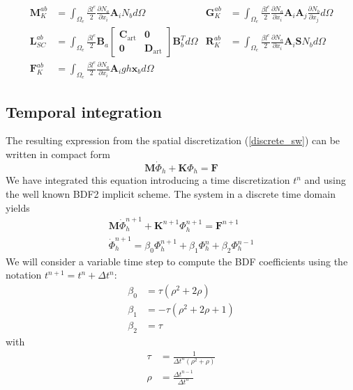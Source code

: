 \documentclass[a4paper,12pt]{article}
\newcommand{\pder}[2]{\frac{\partial#1}{\partial#2}}
\begin{document}
\begin{align}
\displaystyle\mathbf{M}_K^{ab} &= \int_{\Omega_e} \frac{\beta l^e}{2} \pder{N_a}{x_i}\mathbf{A}_i N_b d\Omega &
\displaystyle\mathbf{G}_K^{ab} &= \int_{\Omega_e} \frac{\beta l^e}{2} \pder{N_a}{x_i}\mathbf{A}_i\mathbf{A}_j \pder{N_b}{x_j} d\Omega \nonumber\\
\displaystyle\mathbf{L}_{SC}^{ab} &= \int_{\Omega_e} \frac{\beta l^e}{2} \mathbf{B}_a \left[\begin{matrix}
        \mathbf{C}_\text{art} & \mathbf{0} \\ \mathbf{0} & \mathbf{D}_\text{art}
    \end{matrix}\right] \mathbf{B}_b^T d\Omega &
\displaystyle\mathbf{R}_K^{ab} &= \int_{\Omega_e} \frac{\beta l^e}{2} \pder{N_a}{x_i}\mathbf{A}_i \mathbf{S} N_b d\Omega \\
\displaystyle\mathbf{F}_K^{ab} &= \int_{\Omega_e} \frac{\beta l^e}{2} \pder{N_a}{x_i}\mathbf{A}_i gh\mathbf{x}_b d\Omega
\nonumber
\end{align}


\subsection{Temporal integration}

The resulting expression from the spatial discretization (\ref{discrete_sw}) can be written in compact form 
\begin{equation} \label{discrete_compact}
\mathbf{M}\dot{\Phi}_h + \mathbf{K}\Phi_h = \mathbf{F}
\end{equation}
We have integrated this equation introducing a time discretization $t^n$ and using the well known BDF2 implicit scheme. The system in a discrete time domain yields
\begin{equation}
\begin{split} \label{discrete_bdf2}
\mathbf{M}\dot{\Phi}_h^{n+1} + \mathbf{K}^{n+1}\Phi_h^{n+1} = \mathbf{F}^{n+1} \\
\dot{\Phi}_h^{n+1} = \beta_0 \Phi_h^{n+1} + \beta_1 \Phi_h^n + \beta_2 \Phi_h^{n-1}
\end{split}
\end{equation}
We will consider a variable time step to compute the BDF coefficients using the notation $t^{n+1} = t^n + \Delta t^n$:
\begin{equation}
\begin{split}
\beta_0 &= \tau (\rho^2 + 2\rho) \\
\beta_1 &= -\tau (\rho^2 + 2\rho + 1) \\
\beta_2 &= \tau
\end{split}
\end{equation}
with
\begin{equation}
\begin{split}
\tau &= \frac{1}{\Delta t^n(\rho^2 + \rho)} \\
\rho &= \frac{\Delta t^{n-1}}{\Delta t^n}
\end{split}
\end{equation}
\end{document}
